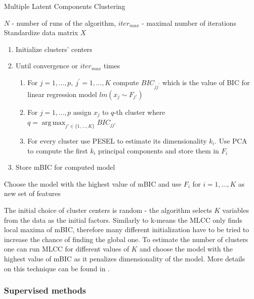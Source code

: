 \documentclass[12pt, wide]{mwart}
\DeclareMathOperator*{\argmax}{arg\,max}
\begin{document}
\begin{algorithm}
\caption{Multiple Latent Components Clustering}
\label{alg:mlcc}          
\begin{algorithmic}                    
    \REQUIRE $N$ - number of runs of the algorithm, $iter_{max}$ - maximal number of iterations
    \STATE Standardize data matrix $X$
        \STATE 
        	\begin{enumerate}
        	\item Initialize clusters' centers
        	\item Until convergence or $iter_{max}$ times
        	\begin{enumerate}
        	\item For $j=1, \ldots, p, \ j^{\prime} = 1, \ldots, K$ compute $BIC_{jj^{\prime}}$ which is the value of BIC for linear regression model $lm(x_j \sim F_{j'})$
        	\item For $j=1, \ldots, p$ assign $x_j$ to $q$-th cluster where $q = \argmax_{j' \in \{1,\ldots, K\}} BIC_{jj'} $
        	\item For every cluster use PESEL to estimate its dimensionality $k_i$. Use PCA to compute the first $k_i$ principal components and store them in $F_i$
        	\end{enumerate}
        	\item Store mBIC for computed model
        	\end{enumerate}
        	\ENDFOR
        \STATE Choose the model with the highest value of mBIC and use $F_i$ for $i=1, \ldots, K$ as new set of features
\end{algorithmic}
\end{algorithm}

The initial choice of cluster centers is random - the algorithm selects $K$ variables from the data as the initial factors. Similarly to k-means the MLCC only finds local maxima of mBIC, therefore many different initialization have to be tried to increase the chance of finding the global one. To estimate the number of clusters one can run MLCC for different values of $K$ and choose the model with the highest value of mBIC as it penalizes dimensionality of the model. More details on this technique can be found in \cite{MLCC}.

\subsubsection{Supervised methods}
\end{document}
